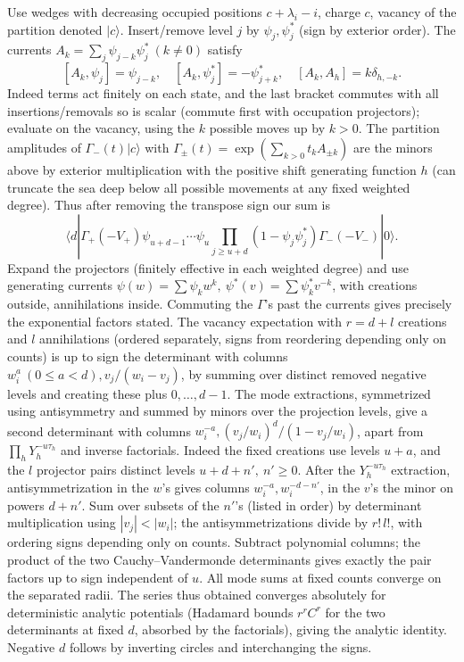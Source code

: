 Use wedges with decreasing occupied positions \(c+\lambda_i-i\), charge \(c\), vacancy of the partition denoted \(|c\rangle\). Insert/remove level \(j\) by \(\psi_j,\psi^*_j\) (sign by exterior order). The currents \(A_k=\sum_j\psi_{j-k}\psi_j^*\ (k\ne0)\) satisfy
\[
 [A_k,\psi_j]=\psi_{j-k},\quad [A_k,\psi^*_j]=-\psi^*_{j+k},\quad
 [A_k,A_h]=k\delta_{h,-k}.
\]
Indeed terms act finitely on each state, and the last bracket commutes with all insertions/removals so is scalar (commute first with occupation projectors); evaluate on the vacancy, using the \(k\) possible moves up by \(k>0\). The partition amplitudes of \(\Gamma_-(t)|c\rangle\) with \(\Gamma_\pm(t)=\exp(\sum_{k>0}t_k A_{\pm k})\) are the minors above by exterior multiplication with the positive shift generating function \(h\) (can truncate the sea deep below all possible movements at any fixed weighted degree). Thus after removing the transpose sign our sum is
\[
 \langle d|\Gamma_+(-V_+)\psi_{u+d-1}\cdots\psi_u
 \prod_{j\ge u+d}(1-\psi_j\psi_j^*)\Gamma_-(-V_-)|0\rangle .
\]
Expand the projectors (finitely effective in each weighted degree) and use generating currents \(\psi(w)=\sum\psi_k w^k,\ \psi^*(v)=\sum\psi_k^* v^{-k}\), with creations outside, annihilations inside. Commuting the \(\Gamma\)'s past the currents gives precisely the exponential factors stated. The vacancy expectation with \(r=d+l\) creations and \(l\) annihilations (ordered separately, signs from reordering depending only on counts) is up to sign the determinant with columns \(w_i^a\ (0\le a<d), v_j/(w_i-v_j)\), by summing over distinct removed negative levels and creating these plus \(0,\ldots,d-1\). The mode extractions, symmetrized using antisymmetry and summed by minors over the projection levels, give a second determinant with columns \(w_i^{-a},(v_j/w_i)^d/(1-v_j/w_i)\), apart from \(\prod_h Y_h^{-u\tau_h}\) and inverse factorials. Indeed the fixed creations use levels \(u+a\), and the \(l\) projector pairs distinct levels \(u+d+n',\ n'\ge0\). After the \(Y_h^{-u\tau_h}\) extraction, antisymmetrization in the \(w\)'s gives columns \(w_i^{-a},w_i^{-d-n'}\), in the \(v\)'s the minor on powers \(d+n'\). Sum over subsets of the \(n'\)'s (listed in order) by determinant multiplication using \(|v_j|<|w_i|\); the antisymmetrizations divide by \(r!\,l!\), with ordering signs depending only on counts. Subtract polynomial columns; the product of the two Cauchy--Vandermonde determinants gives exactly the pair factors up to sign independent of \(u\). All mode sums at fixed counts converge on the separated radii. The series thus obtained converges absolutely for deterministic analytic potentials (Hadamard bounds \(r^r C^{r}\) for the two determinants at fixed \(d\), absorbed by the factorials), giving the analytic identity. Negative \(d\) follows by inverting circles and interchanging the signs.

